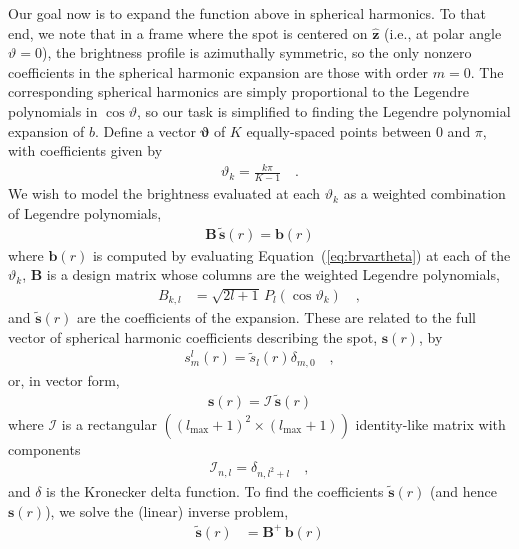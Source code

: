 \documentclass[modern]{aastex62}
\begin{document}
Our goal now is to expand the function above in spherical harmonics. To that end,
we note that in a frame where the spot is centered on $\hat{\mathbf{z}}$
(i.e., at polar angle $\vartheta = 0$), the brightness profile is azimuthally
symmetric, so the only nonzero coefficients in the spherical harmonic
expansion are those with order $m = 0$. The corresponding spherical harmonics are
simply proportional to the Legendre polynomials in $\cos\vartheta$, so our task is
simplified to finding the Legendre polynomial expansion of $b$.
Define a vector $\pmb{\vartheta}$ of $K$ equally-spaced points
between $0$ and $\pi$, with coefficients given by
%
\begin{align}
    \vartheta_k = \frac{k\pi}{K-1}
    \quad.
\end{align}
%
We wish to model the brightness evaluated at each $\vartheta_k$
as a weighted combination of Legendre polynomials,
%
\begin{align}
    \mathbf{B} \, \tilde{\mathbf{s}}(r) = \mathbf{b}(r)
\end{align}
%
%
where $\mathbf{b}(r)$ is computed by evaluating Equation~(\ref{eq:brvartheta})
at each of the $\vartheta_k$,
$\mathbf{B}$ is a design matrix whose columns are
the weighted Legendre polynomials,
%
\begin{align}
    B_{k,l} & = \sqrt{2l + 1} \, P_l\left( \cos \vartheta_k \right)
    \quad,
\end{align}
%
and $\tilde{\mathbf{s}}(r)$ are the coefficients of the expansion.
These are related to the full vector of spherical harmonic coefficients describing
the spot, $\mathbf{s}(r)$, by
%
\begin{align}
    s^l_m(r) = \tilde{s}_l(r) \delta_{m,0}
    \quad,
\end{align}
%
or, in vector form,
%
\begin{align}
    \mathbf{s}(r) = \pmb{\mathcal{I}} \, \tilde{\mathbf{s}}(r)
\end{align}
%
where $\pmb{\mathcal{I}}$ is a rectangular
$\left( \left(l_\mathrm{max} + 1\right)^2 \times \left(l_\mathrm{max} + 1\right) \right)$
identity-like matrix with components
%
\begin{align}
    \mathcal{I}_{n, l} = \delta_{n, l^2 + l}
    \quad,
\end{align}
%
and $\delta$ is the Kronecker delta function.
To find the coefficients $\tilde{\mathbf{s}}(r)$
(and hence $\mathbf{s}(r)$), we solve the (linear) inverse problem,
%
\begin{align}
    \tilde{\mathbf{s}}(r) & = \mathbf{B}^+ \, \mathbf{b}(r)
\end{align}
\end{document}
